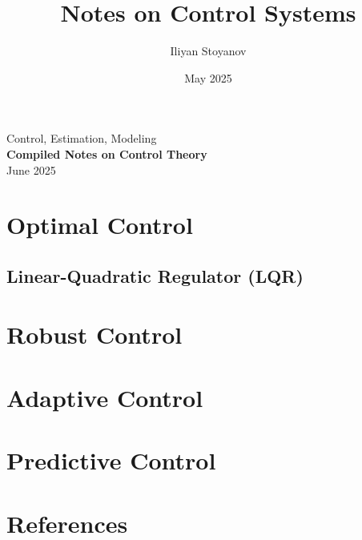 \documentclass[a4paper, 12pt, use style=flow, title in boldface, theorem in new line, emphasize theorems]{einfart} %
\title{Notes on Control Systems}
\author{Iliyan Stoyanov}
\date{May 2025}
\begin{document}
\begin{center}
\LARGE
Control, Estimation, Modeling \\
\vspace{0.5in}
\Huge 
\textbf{Compiled Notes on Control Theory} \\
\vspace{3.5in}
\Large
\vspace{1in}
\normalsize
\vspace{3in}
June 2025
\end{center}

\newpage

\tableofcontents

\newpage


\newpage


\newpage


\newpage


\newpage


\newpage


\newpage


\newpage
\section{Optimal Control}
\subsection{Linear-Quadratic Regulator (LQR)}

\newpage
\section{Robust Control}

\newpage
\section{Adaptive Control}

\newpage
\section{Predictive Control}

\newpage


\newpage


\newpage


\newpage


\newpage
\section{References}
\end{document}
